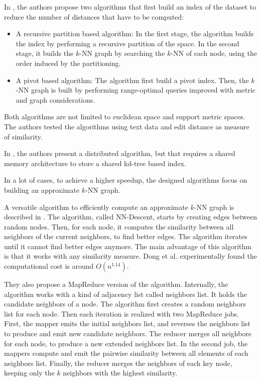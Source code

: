 \documentclass[wcp]{jmlr}
\begin{document}
In \cite{Paredes2006}, the authors propose two algorithms that first build an index of the dataset to reduce the number of distances that have to be computed:

\begin{itemize}
	\item A recursive partition based algorithm: In the first stage, the algorithm builds the index by performing a recursive partition of the space. In the second stage, it builds the $k$-NN graph by searching the $k$-NN of each node, using the order induced by the partitioning.
	\item A pivot based algorithm: The algorithm first build a pivot index. Then, the $k$-NN graph is built by performing range-optimal queries improved with metric and graph considerations.
\end{itemize}

Both algorithms are not limited to euclidean space and support metric spaces. The authors tested the algorithms using text data and edit distance as measure of similarity.

In \cite{Connor2009}, the authors present a distributed algorithm, but that requires a shared memory architecture to store a shared kd-tree based index.

In a lot of cases, to achieve a higher speedup, the designed algorithms focus on building an approximate $k$-NN graph.

A versatile algorithm to efficiently compute an approximate $k$-NN graph is described in \cite{Dong2011}. The algorithm, called NN-Descent, starts by creating edges between random nodes. Then, for each node, it computes the similarity between all neighbors of the current neighbors, to find better edges. The algorithm iterates until it cannot find better edges anymore. The main advantage of this algorithm is that it works with any similarity measure. Dong et al. experimentally found the computational cost is around $O(n^{1.14})$.

They also propose a MapReduce version of the algorithm. Internally, the algorithm works with a kind of adjacency list called neighbors list. It holds the candidate neighbors of a node. The algorithm first creates a random neighbors list for each node. Then each iteration is realized with two MapReduce jobs. First, the mapper emits the initial neighbors list, and reverses the neighbors list to produce and emit new candidate neighbors. The reducer merges all neighbors for each node, to produce a new extended neighbors list. In the second job, the mappers compute and emit the pairwise similarity between all elements of each neighbors list. Finally, the reducer merges the neighbors of each key node, keeping only the $k$ neighbors with the highest similarity.
\end{document}
